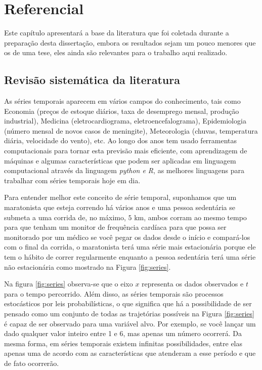 \section{Referencial}\label{sec:refteo}

Este capítulo apresentará a base da literatura que foi coletada durante a preparação desta dissertação, embora os resultados sejam um pouco menores que os de uma tese, eles ainda são relevantes para o trabalho aqui realizado.


    

\subsection{Revis\~ao sistem\'atica da literatura} \label{subsec:revisão}

As séries temporais aparecem em vários campos do conhecimento, tais como Economia (preços de estoque diários, taxa de desemprego mensal, produção industrial), Medicina (eletrocardiograma, eletroencefalograma), Epidemiologia (número mensal de novos casos de meningite), Meteorologia (chuvas, temperatura diária, velocidade do vento), etc. Ao longo dos anos tem usado ferramentas computacionais para tornar esta previsão mais eficiente, com aprendizagem de máquinas e algumas características que podem ser aplicadas em linguagem computacional através da linguagem \textit{python e R}, as melhores linguagens para trabalhar com séries temporais hoje em dia.

Para entender melhor este conceito de série temporal, suponhamos que um maratonista que esteja correndo há vários anos e uma pessoa sedentária se submeta a uma corrida de, no máximo, $5$ km, ambos corram ao mesmo tempo para que tenham um monitor de frequência cardíaca para que possa ser monitorado por um médico se você pegar os dados desde o início e compará-los com o final da corrida, o maratonista terá uma série mais estacionária porque ele tem o hábito de correr regularmente enquanto a pessoa sedentária terá uma série não estacionária como mostrado na Figura \ref{fig:series}.




Na figura \ref{fig:series} observa-se que o eixo $x$ representa os dados observados e $t$ para o tempo percorrido.
Além disso, as séries temporais são processos estocásticos por leis probabilísticas, o que significa que há a possibilidade de ser pensado como um conjunto de todas as trajetórias possíveis na Figura \ref{fig:series} é capaz de ser observado para uma variável alvo. Por exemplo, se você lançar um dado qualquer valor inteiro entre 1 e 6, mas apenas um número ocorrerá. Da mesma forma, em séries temporais existem infinitas possibilidades, entre elas apenas uma de acordo com as características que atenderam a esse período e que de fato ocorrerão.

